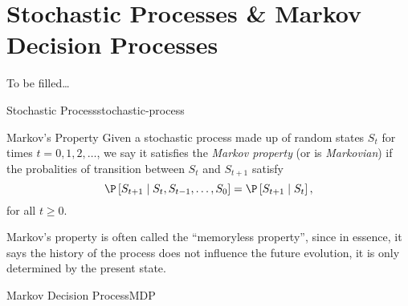 \chapter{Stochastic Processes \& Markov Decision Processes}
\label{chapter:Stochastic}

To be filled\ldots



\begin{dfn}{Stochastic Process}{stochastic-process}
\end{dfn}

\begin{dfn}{Markov's Property}
    Given a stochastic process made up of random states $S_t$ for times $t = 0,
    1, 2, \dots$, we say it satisfies the \emph{Markov property} (or is
    \emph{Markovian}) if the probalities of transition between $S_t$ and
    $S_{t+1}$ satisfy
    \[
        \P \left[ S_{t+1} \mid S_t, S_{t-1}, \dots, S_0 \right] = \P \left[ S_{t+1} \mid S_t \right],
    \]
    for all $t \geq 0$.
\end{dfn}

Markov's property is often called the ``memoryless property'', since in essence,
it says the history of the process does not influence the future evolution, it
is only determined by the present state.

\begin{dfn}{Markov Decision Process}{MDP}
\end{dfn}